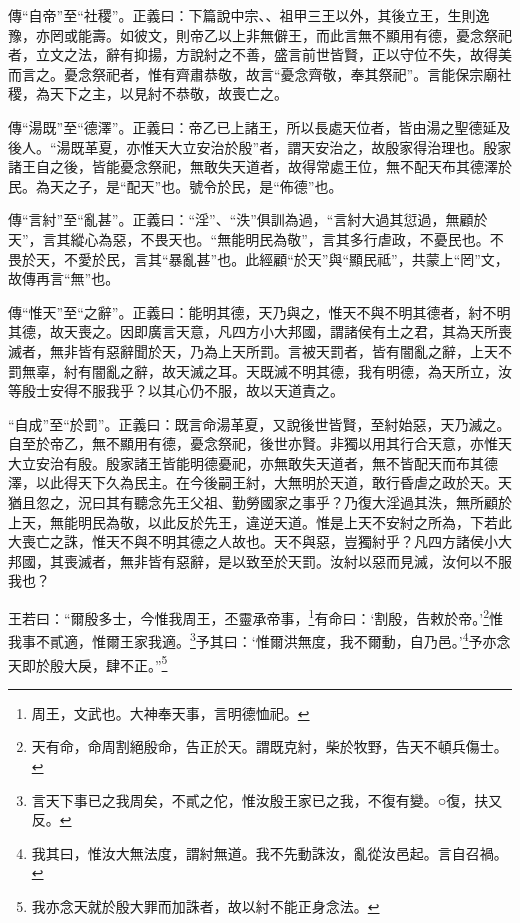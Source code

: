 {\noindent\zhuan{}\fzbyks 傳“自帝”至“社稷”。正義曰：下篇說中宗、、祖甲三王以外，其後立王，生則逸豫，亦罔或能壽。如彼文，則帝乙以上非無僻王，而此言無不顯用有德，憂念祭祀者，立文之法，辭有抑揚，方說紂之不善，盛言前世皆賢，正以守位不失，故得美而言之。憂念祭祀者，惟有齊肅恭敬，故言“憂念齊敬，奉其祭祀”。言能保宗廟社稷，為天下之主，以見紂不恭敬，故喪亡之。 \par}

{\noindent\zhuan{}\fzbyks 傳“湯既”至“德澤”。正義曰：帝乙已上諸王，所以長處天位者，皆由湯之聖德延及後人。“湯既革夏，亦惟天大立安治於殷”者，謂天安治之，故殷家得治理也。殷家諸王自之後，皆能憂念祭祀，無敢失天道者，故得常處王位，無不配天布其德澤於民。為天之子，是“配天”也。號令於民，是“佈德”也。 \par}

{\noindent\zhuan{}\fzbyks 傳“言紂”至“亂甚”。正義曰：“淫”、“泆”俱訓為過，“言紂大過其愆過，無顧於天”，言其縱心為惡，不畏天也。“無能明民為敬”，言其多行虐政，不憂民也。不畏於天，不愛於民，言其“暴亂甚”也。此經顧“於天”與“顯民祗”，共蒙上“罔”文，故傳再言“無”也。 \par}

{\noindent\zhuan{}\fzbyks 傳“惟天”至“之辭”。正義曰：能明其德，天乃與之，惟天不與不明其德者，紂不明其德，故天喪之。因即廣言天意，凡四方小大邦國，謂諸侯有土之君，其為天所喪滅者，無非皆有惡辭聞於天，乃為上天所罰。言被天罰者，皆有闇亂之辭，上天不罰無辜，紂有闇亂之辭，故天滅之耳。天既滅不明其德，我有明德，為天所立，汝等殷士安得不服我乎？以其心仍不服，故以天道責之。 \par}

{\noindent\shu{}\fzkt “自成”至“於罰”。正義曰：既言命湯革夏，又說後世皆賢，至紂始惡，天乃滅之。自至於帝乙，無不顯用有德，憂念祭祀，後世亦賢。非獨以用其行合天意，亦惟天大立安治有殷。殷家諸王皆能明德憂祀，亦無敢失天道者，無不皆配天而布其德澤，以此得天下久為民主。在今後嗣王紂，大無明於天道，敢行昏虐之政於天。天猶且忽之，況曰其有聽念先王父祖、勤勞國家之事乎？乃復大淫過其泆，無所顧於上天，無能明民為敬，以此反於先王，違逆天道。惟是上天不安紂之所為，下若此大喪亡之誅，惟天不與不明其德之人故也。天不與惡，豈獨紂乎？凡四方諸侯小大邦國，其喪滅者，無非皆有惡辭，是以致至於天罰。汝紂以惡而見滅，汝何以不服我也？ \par}

王若曰：“爾殷多士，今惟我周王，丕靈承帝事，\footnote{周王，文武也。大神奉天事，言明德恤祀。}有命曰：‘割殷，告敕於帝。’\footnote{天有命，命周割絕殷命，告正於天。謂既克紂，柴於牧野，告天不頓兵傷士。}惟我事不貳適，惟爾王家我適。\footnote{言天下事已之我周矣，不貳之佗，惟汝殷王家已之我，不復有變。○復，扶又反。}予其曰：‘惟爾洪無度，我不爾動，自乃邑。’\footnote{我其曰，惟汝大無法度，謂紂無道。我不先動誅汝，亂從汝邑起。言自召禍。}予亦念天即於殷大戾，肆不正。”\footnote{我亦念天就於殷大罪而加誅者，故以紂不能正身念法。}


